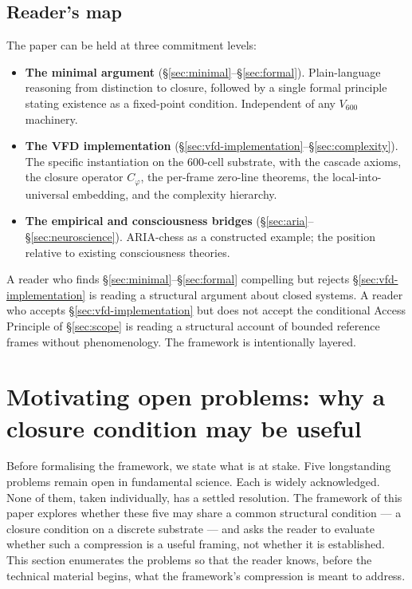 \documentclass[11pt]{article}
\theoremstyle{plain}
\theoremstyle{definition}
\theoremstyle{remark}
\newcommand{\Cph}{C_\varphi}
\begin{document}
\subsection{Reader's map}

The paper can be held at three commitment levels:

\begin{itemize}[leftmargin=2em]
\item \textbf{The minimal argument} (\S\ref{sec:minimal}--\S\ref{sec:formal}). Plain-language reasoning from distinction to closure, followed by a single formal principle stating existence as a fixed-point condition. Independent of any $V_{600}$ machinery.
\item \textbf{The VFD implementation} (\S\ref{sec:vfd-implementation}--\S\ref{sec:complexity}). The specific instantiation on the 600-cell substrate, with the cascade axioms, the closure operator $\Cph$, the per-frame zero-line theorems, the local-into-universal embedding, and the complexity hierarchy.
\item \textbf{The empirical and consciousness bridges} (\S\ref{sec:aria}--\S\ref{sec:neuroscience}). ARIA-chess as a constructed example; the position relative to existing consciousness theories.
\end{itemize}

A reader who finds \S\ref{sec:minimal}--\S\ref{sec:formal} compelling but rejects \S\ref{sec:vfd-implementation} is reading a structural argument about closed systems. A reader who accepts \S\ref{sec:vfd-implementation} but does not accept the conditional Access Principle of \S\ref{sec:scope} is reading a structural account of bounded reference frames without phenomenology. The framework is intentionally layered.

\section{Motivating open problems: why a closure condition may be useful}\label{sec:unfinished}

Before formalising the framework, we state what is at stake. Five longstanding problems remain open in fundamental science. Each is widely acknowledged. None of them, taken individually, has a settled resolution. The framework of this paper explores whether these five may share a common structural condition --- a closure condition on a discrete substrate --- and asks the reader to evaluate whether such a compression is a useful framing, not whether it is established. This section enumerates the problems so that the reader knows, before the technical material begins, what the framework's compression is meant to address.
\end{document}
